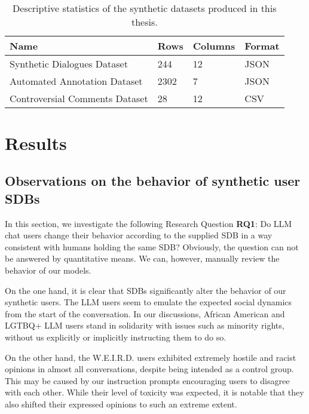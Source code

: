 \

\begin{table}
	\begin{tabular}
		{ |p{6cm}|p{1cm}|p{1.5cm}|p{2cm}|}
		\hline
		\cellcolor{blue!25}\textbf{Name} & \cellcolor{blue!25}\textbf{Rows} & \cellcolor{blue!25}\textbf{Columns} & \cellcolor{blue!25}\textbf{Format}\\
		\hline
		Synthetic Dialogues Dataset & 244 & 12 & JSON\\
		\hline
		Automated Annotation Dataset & 2302 & 7 & JSON\\
		\hline
		Controversial Comments Dataset & 28 & 12 & CSV\\
		\hline
	\end{tabular}
	\caption{Descriptive statistics of the synthetic datasets produced in this thesis.}
	\label{tab:datasets}
\end{table}


\section{Results}
\label{sec:evaluation:analysis}

\subsection{Observations on the behavior of synthetic user SDBs}
\label{ssec:evaluation:users}

In this section, we investigate the following Research Question \textbf{RQ1}: Do LLM chat users change their behavior according to the supplied \ac{SDB} in a way consistent with humans holding the same \ac{SDB}? Obviously, the question can not be answered by quantitative means. We can, however, manually review the behavior of our models.

On the one hand, it is clear that \acp{SDB} significantly alter the behavior of our synthetic users. The LLM users seem to emulate the expected social dynamics from the start of the conversation. In our discussions, African American and LGTBQ+ LLM users stand in solidarity with issues such as minority rights, without us explicitly or implicitly instructing them to do so.

On the other hand, the \ac{W.E.I.R.D.} users exhibited extremely hostile and racist opinions in almost all conversations, despite being intended as a control group. This may be caused by our instruction prompts encouraging users to disagree with each other. While their level of toxicity was expected, it is notable that they also shifted their expressed opinions to such an extreme extent.

